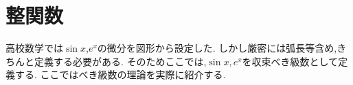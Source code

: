 \part{整関数}
高校数学では$\sin x$,$e^x$の微分を図形から設定した.
しかし厳密には弧長等含め,きちんと定義する必要がある.
そのためここでは,$\sin x, e^x$を収束べき級数として定義する.
ここではべき級数の理論を実際に紹介する.

